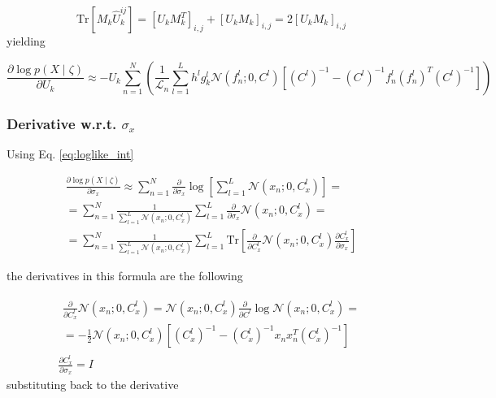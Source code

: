 \documentclass{paper}
\begin{document}
\begin{equation}
\textrm{Tr} \left[M_k \hat U_k^{ij} \right] = \left[U_k M_k^T \right]_{i,j} + \left[ U_k M_k \right]_{i,j} = 2 \left[U_k M_k \right]_{i,j}
\end{equation}
%
yielding

\begin{equation}
\frac{\partial \log p(X \mid \zeta)}{\partial U_k} \approx - U_k \sum_{n=1}^N \left(\frac{1}{\mathcal{L}_n}  \sum_{l=1}^{L} h^l g^l_k \mathcal{N}(f_n^l;0,C^l)   \left[ (C^l)^{-1} - (C^l)^{-1} f_n^l (f_n^l)^T (C^l)^{-1} \right] \right)
\end{equation}

\subsubsection{Derivative w.r.t. $\sigma_x$}

Using Eq. \ref{eq:loglike_int}

\begin{equation}
\begin{split}
\frac{\partial \log p(X \mid \zeta)}{\partial \sigma_x} \approx \sum_{n=1}^N \frac{\partial}{\partial \sigma_x} \log \left[ \sum_{l=1}^{L} \mathcal{N}(x_n;0,C_x^l) \right] = \\
= \sum_{n=1}^N \frac{1}{\sum_{l=1}^{L} \mathcal{N}(x_n;0,C_x^l)} \sum_{l=1}^{L} \frac{\partial}{\partial \sigma_x} \mathcal{N}(x_n;0,C_x^l) = \\
= \sum_{n=1}^N \frac{1}{\sum_{l=1}^{L} \mathcal{N}(x_n;0,C_x^l)} \sum_{l=1}^{L} \textrm{Tr} \left[ \frac{\partial}{\partial C_x^l} \mathcal{N}(x_n;0,C_x^l) \frac{\partial C_x^l}{\partial \sigma_x} \right]
\end{split}
\end{equation}

the derivatives in this formula are the following

\begin{eqnarray}
\begin{split}
\frac{\partial}{\partial C_x^l} \mathcal{N}(x_n;0,C_x^l) = \mathcal{N}(x_n;0,C_x^l) \frac{\partial}{\partial C^l} \log \mathcal{N}(x_n;0,C_x^l) = \\
= -\frac{1}{2} \mathcal{N}(x_n;0,C_x^l) \left[ (C_x^l)^{-1} - (C_x^l)^{-1} x_n x_n^T (C_x^l)^{-1} \right]
\end{split} \\
\frac{\partial C_x^l}{\partial \sigma_x} = I
\end{eqnarray}
%
substituting back to the derivative
\end{document}
